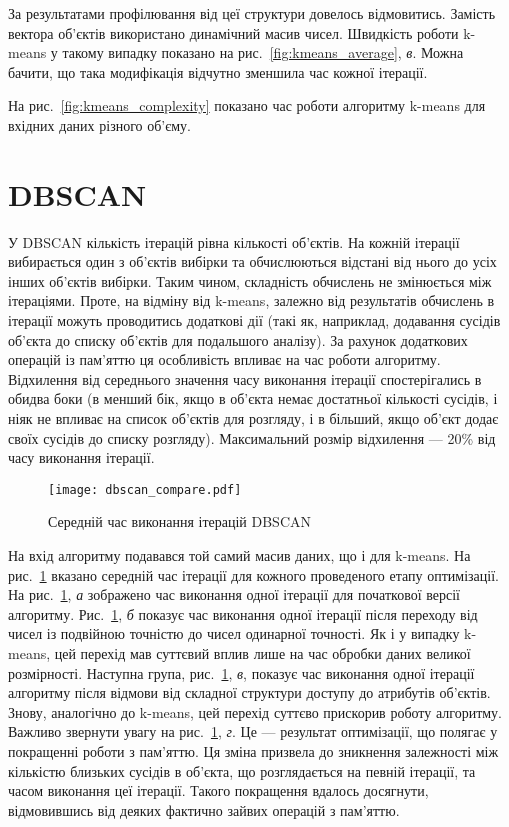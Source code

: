                 За результатами профілювання від цеї структури довелось відмовитись. Замість вектора об’єктів використано динамічний масив чисел. Швидкість роботи k-means у такому випадку показано на рис.~\ref{fig:kmeans_average}, \emph{в}. Можна бачити, що така модифікація відчутно  зменшила час кожної ітерації.
                
                На рис.~\ref{fig:kmeans_complexity} показано час роботи алгоритму k-means для вхідних даних різного об’єму.
                
            \section{DBSCAN}
                У DBSCAN кількість ітерацій рівна кількості об’єктів. На кожній ітерації вибирається один з об’єктів вибірки та обчислюються відстані від нього до усіх інших об’єктів вибірки. Таким чином, складність обчислень не змінюється між ітераціями. Проте, на відміну від k-means, залежно від результатів обчислень в ітерації можуть проводитись додаткові дії (такі як, наприклад, додавання сусідів об’єкта до списку об’єктів для подальшого аналізу). За рахунок додаткових операцій із пам’яттю ця особливість впливає на час роботи алгоритму. Відхилення від середнього значення часу виконання ітерації спостерігались в обидва боки (в менший бік, якщо в об’єкта немає достатньої кількості сусідів, і ніяк не впливає на список об’єктів для розгляду, і в більший, якщо об’єкт додає своїх сусідів до списку розгляду). Максимальний розмір відхилення --- 20\% від часу виконання ітерації.
                
                \begin{figure}
                    \centering
                    \texttt{[image: dbscan\_compare.pdf]}
                    \caption{Середній час виконання ітерацій DBSCAN}\label{fig:dbscan_compare}
                \end{figure}
                
                На вхід алгоритму подавався той самий масив даних, що і для k-means. На рис.~\ref{fig:dbscan_compare} вказано середній час ітерації для кожного проведеного етапу оптимізації. На рис.~\ref{fig:dbscan_compare}, \emph{а} зображено час виконання одної ітерації для початкової версії алгоритму. Рис.~\ref{fig:dbscan_compare}, \emph{б} показує час виконання одної ітерації після переходу від чисел із подвійною точністю до чисел одинарної точності. Як і у випадку k-means, цей перехід мав суттєвий вплив лише на час обробки даних великої розмірності. Наступна група, рис.~\ref{fig:dbscan_compare}, \emph{в}, показує час виконання одної ітерації алгоритму після відмови від складної структури доступу до атрибутів об’єктів. Знову, аналогічно до k-means, цей перехід суттєво прискорив роботу алгоритму. Важливо звернути увагу на рис.~\ref{fig:dbscan_compare}, \emph{г}. Це --- результат оптимізації, що полягає у покращенні роботи з пам’яттю. Ця зміна призвела до зникнення залежності між кількістю близьких сусідів в об’єкта, що розглядається на певній ітерації, та часом виконання цеї ітерації. Такого покращення вдалось досягнути, відмовившись від деяких фактично зайвих операцій з пам’яттю.
                
